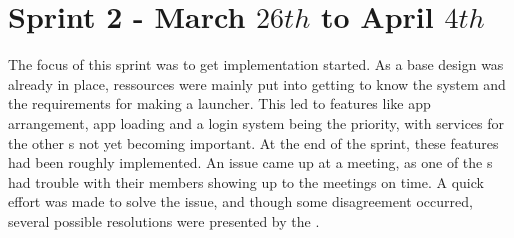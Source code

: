 \section{Sprint 2 - March $26th$ to April $4th$}
The focus of this sprint was to get implementation started. 
As a base design was already in place, ressources were mainly put into getting to know the system and the requirements for making a launcher. 
This led to features like app arrangement, app loading and a login system being the priority, with services for the other \localgroup{}s not yet becoming important. 
At the end of the sprint, these features had been roughly implemented. \newline
An issue came up at a meeting, as one of the \localgroup{}s had trouble with their members showing up to the meetings on time. 
A quick effort was made to solve the issue, and though some disagreement occurred, several possible resolutions were presented by the \globalgroup{}.